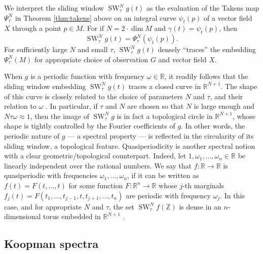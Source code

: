 \documentclass[11pt]{article}
\theoremstyle{definition}
\theoremstyle{remark}
\newcommand{\RR}{\mathbb{R}}
\newcommand{\ZZ}{\mathbb{Z}}
\newcommand{\TT}{\mathbb{T}}
\DeclareMathOperator{\SW}{SW}
\begin{document}

    We interpret the sliding window $\SW^N_\tau g(t)$ as the evaluation of the Takens map $\Psi^N_\tau$ in Theorem \ref{thm:takens} above on an integral curve $\psi_t(p)$ of a vector field $X$ through a point $p\in M$.
    For if $N=2\cdot\dim{M}$ and $\gamma(t) = \psi_t(p)$, then
    \[\SW_\tau^Ng(t) = \Psi^N_\tau(\psi_t(p)).\]
    For sufficiently large $N$ and small $\tau$, $\SW_\tau^Ng(t)$  densely ``traces'' the embedding $\Psi^N_\tau(M)$ for appropriate choice of observation $G$
    and vector field $X$.



    When $g$ is a periodic function with frequency $\omega\in \RR$, it readily follows
    that the sliding window embedding $\SW^N_\tau g(t)$  traces a closed curve in $\RR^{N+1}$.
    The shape of this curve is closely related to the choice of parameters $N$ and $\tau$, and their relation to $\omega$ \cite{perea2015sliding}.
    In particular, if $\tau$ and $N$ are chosen so that $N$ is large enough and
    $N\tau\omega \approx 1$, then the image of $\SW^N_\tau g$ is in fact a topological circle in $\RR^{N+1}$, whose shape
    is tightly controlled by the Fourier coefficients of $g$.
    In other words, the periodic nature of $g$ ---  a spectral property --- is reflected in the circularity of its sliding window,
    a topological feature.
    Quasiperiodicity is another spectral notion with  a  clear geometric/topological counterpart.
    Indeed, let
     $1,\omega_1, \ldots, \omega_n\in \RR$ be linearly independent over the rational numbers.
    We say that $f: \RR \longrightarrow \RR$ is quasiperiodic with frequencies $\omega_1,\ldots, \omega_n$, if
    it can be written as
    $f(t) = F(t, \ldots, t)$ for some function $F: \RR^n \longrightarrow \RR$  whose  $j$-th marginals $f_j(t) = F(t_1 ,\ldots, t_{j-1}, t , t_{j+1},\ldots, t_n)$ are periodic with frequency $\omega_j$.
    In this case, and for appropriate $N$ and $\tau$, the set $\SW_\tau^N f(\ZZ)$ is dense in an $n$-dimensional torus
    embedded  in $\RR^{N+1}$ \cite{perea2016persistent, hitesh2018}.


    \subsection{Koopman spectra}
\end{document}
